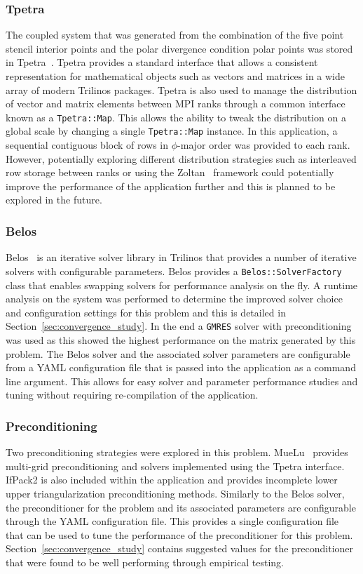 \subsubsection{Tpetra}
The coupled system that was generated from the combination of the five point stencil interior points and the polar divergence condition polar points was stored in Tpetra~\citep{TpetraPaper}. Tpetra provides a standard interface that allows a consistent representation for mathematical objects such as vectors and matrices in a wide array of modern Trilinos packages. Tpetra is also used to manage the distribution of vector and matrix elements between MPI ranks through a common interface known as a \texttt{Tpetra::Map}. This allows the ability to tweak the distribution on a global scale by changing a single \texttt{Tpetra::Map} instance. In this application, a sequential contiguous block of rows in $\phi$-major order was provided to each rank. However, potentially exploring different distribution strategies such as interleaved row storage between ranks or using the Zoltan~\citep{ZoltanUsersGuide} framework could potentially improve the performance of the application further and this is planned to be explored in the future.
\subsubsection{Belos}
Belos~\citep{BelosPaper} is an iterative solver library in Trilinos that provides a number of iterative solvers with configurable parameters. Belos provides a \texttt{Belos::SolverFactory} class that enables swapping solvers for performance analysis on the fly. A runtime analysis on the system was performed to determine the improved solver choice and configuration settings for this problem and this is detailed in Section~\ref{sec:convergence_study}. In the end a \texttt{GMRES} solver with preconditioning was used as this showed the highest performance on the matrix generated by this problem. The Belos solver and the associated solver parameters are configurable from a YAML configuration file that is passed into the application as a command line argument. This allows for easy solver and parameter performance studies and tuning without requiring re-compilation of the application.
\subsubsection{Preconditioning}
Two preconditioning strategies were explored in this problem. MueLu~\citep{MueLuUsersGuide} provides multi-grid preconditioning and solvers implemented using the Tpetra interface. IfPack2 is also included within the application and provides incomplete lower upper triangularization preconditioning methods. Similarly to the Belos solver, the preconditioner for the problem and its associated parameters are configurable through the YAML configuration file. This provides a single configuration file that can be used to tune the performance of the preconditioner for this problem. Section~\ref{sec:convergence_study} contains suggested values for the preconditioner that were found to be well performing through empirical testing.
